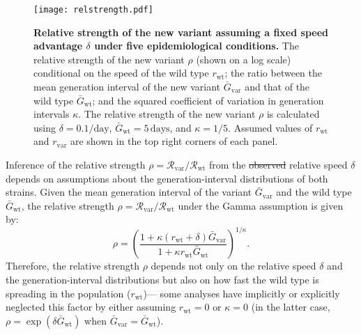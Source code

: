 \documentclass[12pt]{article}
\newcommand{\vvvar}{\mathrm{var}}
\newcommand{\wwwt}{\mathrm{wt}}
\newcommand{\rx}[1]{\ensuremath{{r}_{#1}}\xspace}
\newcommand{\rw}{\rx{\wwwt}}
\newcommand{\rv}{\rx{\vvvar}}
\newcommand{\Rx}[1]{\ensuremath{{\mathcal R}_{#1}}\xspace}
\newcommand{\Rw}{\Rx{\wwwt}}
\newcommand{\Rv}{\Rx{\vvvar}}
\newcommand{\days}{\ensuremath{\, \textrm{days}}}
\newcommand{\pday}{\ensuremath{/\textrm{day}}}
\newcommand{\Gx}[1]{\ensuremath{{\bar G}_{#1}}\xspace}
\newcommand{\Gw}{\Gx{\wwwt}}
\newcommand{\Gv}{\Gx{\vvvar}}
\providecommand{\DIFdeltex}[1]{{\protect\color{red}\sout{#1}}}                      %
\providecommand{\DIFdelbegin}{} %
\providecommand{\DIFdelend}{} %
\providecommand{\DIFdel}[1]{\texorpdfstring{\DIFdeltex{#1}}{}} %
\newcommand{\DIFscaledelfig}{0.5}
\newlength{\DIFdelgraphicswidth} %
\newlength{\DIFdelgraphicsheight} %
\newcommand{\DIFdelincludegraphics}[2][]{%
\sbox{\DIFdelgraphicsbox}{\DIFOincludegraphics[#1]{#2}}%
\settoboxwidth{\DIFdelgraphicswidth}{\DIFdelgraphicsbox} %
\settoboxtotalheight{\DIFdelgraphicsheight}{\DIFdelgraphicsbox} %
\scalebox{\DIFscaledelfig}{%
\parbox[b]{\DIFdelgraphicswidth}{\usebox{\DIFdelgraphicsbox}\\[-\baselineskip] \rule{\DIFdelgraphicswidth}{0em}}\llap{\resizebox{\DIFdelgraphicswidth}{\DIFdelgraphicsheight}{%
\setlength{\unitlength}{\DIFdelgraphicswidth}%
\begin{picture}(1,1)%
\thicklines\linethickness{2pt} %
{\color[rgb]{1,0,0}\put(0,0){\framebox(1,1){}}}%
{\color[rgb]{1,0,0}\put(0,0){\line( 1,1){1}}}%
{\color[rgb]{1,0,0}\put(0,1){\line(1,-1){1}}}%
\end{picture}%
}\hspace*{3pt}}} %
} %
\DeclareRobustCommand{\DIFdelbegin}{\DIFOdelbegin \let\includegraphics\DIFdelincludegraphics} %
\DeclareRobustCommand{\DIFdelend}{\DIFOaddend \let\includegraphics\DIFOincludegraphics} %
\begin{document}
\begin{figure}[!t]
\texttt{[image: relstrength.pdf]}
\caption{
\textbf{Relative strength of the new variant assuming a fixed speed advantage $\delta$ under five epidemiological conditions.}
The relative strength of the new variant $\rho$ (shown on a log scale) conditional on the speed of the wild type $\rw$; the ratio between the mean generation interval of the new variant $\Gv$ and that of the wild type $\Gw$; and the squared coefficient of variation in generation intervals $\kappa$.
The relative strength of the new variant $\rho$ is calculated using $\delta=0.1\pday$, $\Gw = 5\days$, and $\kappa = 1/5$.
Assumed values of $\rw$ and $\rv$ are shown in the top right corners of each panel.
}
\label{fig:relstrength}
\end{figure}

Inference of the relative strength $\rho = \Rv/\Rw$ from the \DIFdelbegin \DIFdel{observed }\DIFdelend relative speed $\delta$ depends on assumptions about the generation-interval distributions of both strains.
Given the mean generation interval of the variant $\Gv$ and the wild type $\Gw$, the relative strength $\rho = \Rv/\Rw$ under the Gamma assumption \citep{park2019practical} is given by:
\begin{equation}
\rho = \left(\frac{1 + \kappa (\rw + \delta) \Gv}{1 + \kappa \rw \Gw}\right)^{1/\kappa}.
\end{equation}
Therefore, the relative strength $\rho$ depends not only on the relative speed $\delta$ and the generation-interval distributions but also on how fast the wild type is spreading in the population (\rw)---
some analyses have implicitly or explicitly neglected this factor by either assuming $\rw = 0$ \citep{switzerland2021variant} or $\kappa = 0$ \citep{davies2021estimated} (in the latter case, $\rho = \exp(\delta \Gw)$ when $\Gv=\Gw$).
\end{document}
